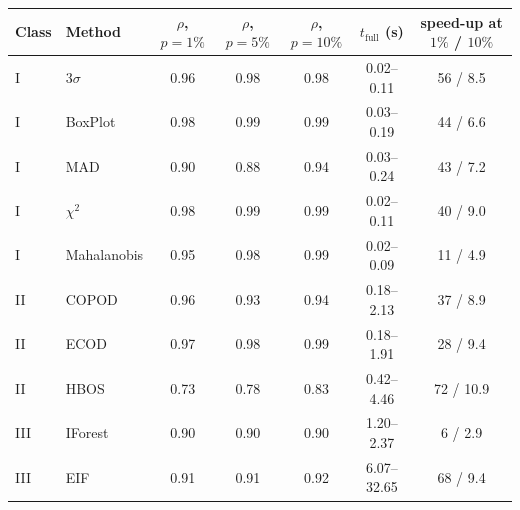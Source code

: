 \begin{tabular}{llccccc}
\hline
\textbf{Class} & \textbf{Method} & $\rho$, $p=1\%$ & $\rho$, $p=5\%$ & $\rho$, $p=10\%$ & $t_{\mathrm{full}}$ (s) & speed-up at $1\%$ / $10\%$ \\
\hline
I & $3\sigma$ & 0.96 & 0.98 & 0.98 & 0.02--0.11 & 56 / 8.5 \\
I & BoxPlot & 0.98 & 0.99 & 0.99 & 0.03--0.19 & 44 / 6.6 \\
I & MAD & 0.90 & 0.88 & 0.94 & 0.03--0.24 & 43 / 7.2 \\
I & $\chi^2$ & 0.98 & 0.99 & 0.99 & 0.02--0.11 & 40 / 9.0 \\
I & Mahalanobis & 0.95 & 0.98 & 0.99 & 0.02--0.09 & 11 / 4.9 \\
II & COPOD & 0.96 & 0.93 & 0.94 & 0.18--2.13 & 37 / 8.9 \\
II & ECOD & 0.97 & 0.98 & 0.99 & 0.18--1.91 & 28 / 9.4 \\
II & HBOS & 0.73 & 0.78 & 0.83 & 0.42--4.46 & 72 / 10.9 \\
III & IForest & 0.90 & 0.90 & 0.90 & 1.20--2.37 & 6 / 2.9 \\
III & EIF & 0.91 & 0.91 & 0.92 & 6.07--32.65 & 68 / 9.4 \\
\hline
\end{tabular}
